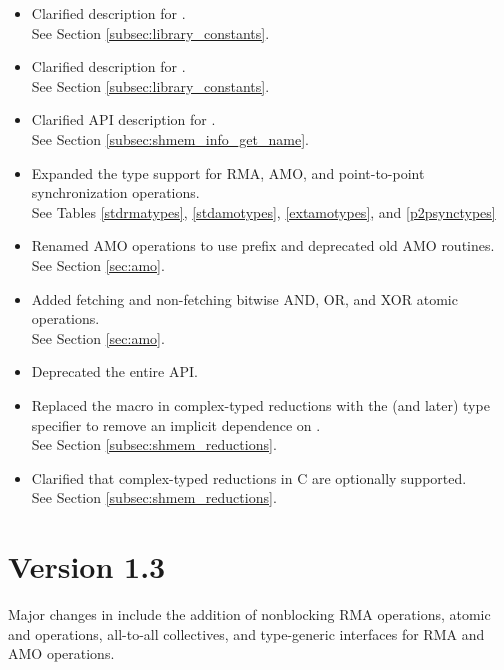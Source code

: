 \begin{itemize}
%
\item Clarified description for .
\\See Section \ref{subsec:library_constants}.
%
\item Clarified description for .
\\See Section \ref{subsec:library_constants}.
%
\item Clarified API description for .
\\See Section \ref{subsec:shmem_info_get_name}.
%
\item Expanded the type support for RMA, AMO, and point-to-point
    synchronization operations.
\\ See Tables \ref{stdrmatypes}, \ref{stdamotypes}, \ref{extamotypes}, and
    \ref{p2psynctypes}
%
\item Renamed AMO operations to use  prefix and
      deprecated old AMO routines.
\\ See Section \ref{sec:amo}.
%
\item Added fetching and non-fetching bitwise AND, OR, and XOR atomic
      operations.
\\ See Section \ref{sec:amo}.
%
\item Deprecated the entire \Fortran API.
%
\item Replaced the  macro in complex-typed reductions with the
      \Cstd[99] (and later) type specifier  to remove an
      implicit dependence on .
\\ See Section \ref{subsec:shmem_reductions}.
%
\item Clarified that complex-typed reductions in C are optionally supported.
\\ See Section \ref{subsec:shmem_reductions}.
%
\end{itemize}




\section{Version 1.3}
Major changes in \openshmem[1.3] include the addition of
nonblocking \ac{RMA} operations,
atomic \PUT{} and \GET{} operations,
all-to-all collectives,
and \Cstd[11] type-generic interfaces for \ac{RMA} and \ac{AMO} operations.

